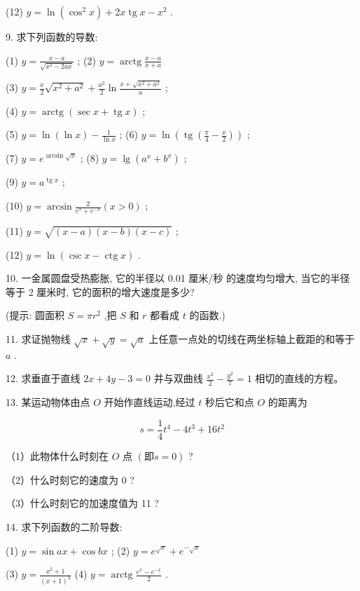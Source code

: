 \documentclass[10pt]{article}
\begin{document}
(12) \(y = \ln \left( {{\cos }^{2}x}\right) + {2x}\operatorname{tg}x - {x}^{2}\) .

9. 求下列函数的导数:

(1) \(y = \frac{x - a}{\sqrt{{x}^{2} - {2ax}}}\) ; (2) \(y = \operatorname{arctg}\frac{x - a}{x + a}\)

(3) \(y = \frac{x}{2}\sqrt{{x}^{2} + {a}^{2}} + \frac{{a}^{2}}{2}\ln \frac{x + \sqrt{{x}^{2} + {a}^{2}}}{a}\) ;

(4) \(y = \operatorname{arctg}\left( {\sec x + \operatorname{tg}x}\right)\) ;

(5) \(y = \ln \left( {\ln x}\right) - \frac{1}{\ln x}\) ; (6) \(y = \ln \left( {\operatorname{tg}\left( {\frac{\pi }{4} - \frac{x}{2}}\right) }\right)\) ;

(7) \(y = {e}^{\arcsin \sqrt{x}}\) ; (8) \(y = \lg \left( {{a}^{x} + {b}^{x}}\right)\) ;

(9) \(y = {a}^{\operatorname{tg}x}\) ;

(10) \(y = \arcsin \frac{2}{{e}^{x} + {e}^{-x}}\left( {x > 0}\right)\) ;

(11) \(y = \sqrt{\left( {x - a}\right) \left( {x - b}\right) \left( {x - c}\right) }\) ;

(12) \(y = \ln \left( {\csc x - \operatorname{ctg}x}\right)\) .

10. 一金属圆盘受热膨胀, 它的半径以 0.01 厘米/秒 的速度均匀增大, 当它的半径等于 2 厘米时, 它的面积的增大速度是多少?

(提示: 圆面积 \(S = \pi {r}^{2}\) ,把 \(S\) 和 \(r\) 都看成 \(t\) 的函数.)

11. 求证抛物线 \(\sqrt{x} + \sqrt{y} = \sqrt{a}\) 上任意一点处的切线在两坐标轴上截距的和等于 \(a\) .

12. 求垂直于直线 \({2x} + {4y} - 3 = 0\) 并与双曲线 \(\frac{{x}^{2}}{2} - \frac{{y}^{2}}{7} = 1\) 相切的直线的方程。

13. 某运动物体由点 \(O\) 开始作直线运动,经过 \(t\) 秒后它和点 \(O\) 的距离为

\[
s = \frac{1}{4}{t}^{4} - 4{t}^{3} + {16}{t}^{2}
\]

（1）此物体什么时刻在 \(O\) 点 \(\left( {\text{即}s = 0}\right)\) ?

（2）什么时刻它的速度为 0 ?

（3）什么时刻它的加速度值为 11 ?

14. 求下列函数的二阶导数:

(1) \(y = \sin {ax} + \cos {bx}\) ; (2) \(y = {e}^{\sqrt{x}} + {e}^{-\sqrt{x}}\)

(3) \(y = \frac{{x}^{2} + 1}{{\left( x + 1\right) }^{3}}\) (4) \(y = \operatorname{arctg}\frac{{e}^{x} - {e}^{-x}}{2}\) .
\end{document}
